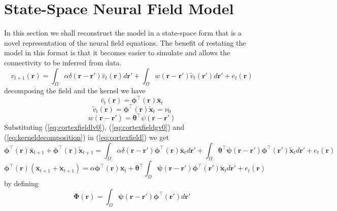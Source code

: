 \documentclass[onecolumn,draftcls]{IEEEtran}
\begin{document}
\section{State-Space Neural Field Model}
In this section we shall reconstruct the model in a state-space form that is a novel representation of the neural field equations. The benefit of restating the model in this format is that it becomes easier to simulate and allows the connectivity to be inferred from data. \begin{equation}
 v_{t+1}(\mathbf r)=\int_{\Omega} \alpha \delta(\mathbf r-\mathbf r')\bar v_t(\mathbf r)d \mathbf r'+\int_{\Omega} w(\mathbf r -\mathbf r')\tilde v_t(\mathbf r')d\mathbf r'+e_t(\mathbf r)
\label{eq:cortexfield}
\end{equation}
decomposing the field and the kernel we have
\begin{equation}
\bar v_t(\mathbf r)=\boldsymbol \phi^{\top}(\mathbf r)\bar{\mathbf x}_t
\label{eq:cortexfieldlv0}
\end{equation}
\begin{equation}
\tilde v_t(\mathbf r)=\boldsymbol \phi^{\top}(\mathbf r)\tilde{\mathbf x}_t=\nu_0
\label{eq:cortexfieldgv0}
\end{equation}
\begin{equation}
 w(\mathbf r -\mathbf r')=\boldsymbol \theta^{\top}\psi(\mathbf r -\mathbf r')
\label{eq:kerneldecomposition}
\end{equation}
Substituting (\ref{eq:cortexfieldlv0}), (\ref{eq:cortexfieldgv0}) and (\ref{eq:kerneldecomposition}) in (\ref{eq:cortexfield}) we get
\begin{equation}
 \boldsymbol \phi^{\top}(\mathbf r)\bar{\mathbf x}_{t+1}+\boldsymbol \phi^{\top}(\mathbf r)\tilde{\mathbf x}_{t+1}=
\int_\Omega\alpha\delta(\mathbf r- \mathbf r')\boldsymbol\phi^{\top}(\mathbf r)\bar{\mathbf x}_td\mathbf r'+\int_\Omega\boldsymbol \theta^{\top}\boldsymbol\psi(\mathbf r -\mathbf r')\boldsymbol\phi^{\top}(\mathbf r')\tilde{\mathbf x}_td\mathbf r'+e_t(\mathbf r)
\label{eq:decomposedcortexfield}
\end{equation}
\begin{equation}
 \boldsymbol \phi^{\top}(\mathbf r)(\bar{\mathbf x}_{t+1}+\tilde{\mathbf x}_{t+1})=\alpha \boldsymbol\phi^{\top}(\mathbf r)\bar{\mathbf x}_{t}+\boldsymbol \theta^{\top}\int_{\Omega}\boldsymbol\psi(\mathbf r -\mathbf r')\boldsymbol\phi^{\top}(\mathbf r')\tilde{\mathbf x}_td\mathbf r'+e_t(\mathbf r)
\end{equation}
by defining
\begin{equation}
 \boldsymbol\Phi(\mathbf r)=\int_{\Omega}\boldsymbol\psi(\mathbf r -\mathbf r')\boldsymbol\phi^{\top}(\mathbf r')d\mathbf r'
\label{eq:convolution}
\end{equation}
\end{document}
